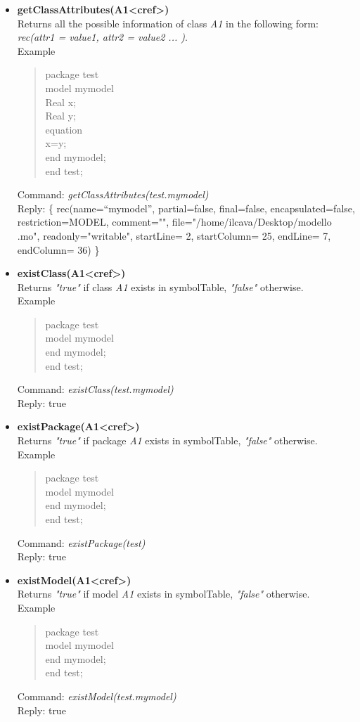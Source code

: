 \documentclass[11pt,a4paper,oneside,english]{book}
\newenvironment{modelicaExamples}{\begin{itemize}}{\end{itemize}}
\newcommand{\api}[2]{\item \textbf{#1} \\ #2}
\newcommand{\tab}{\hspace{2em}}
\newcommand{\command}[1]{Command: \textit{#1}\\}
\newcommand{\reply}[1]{Reply: #1}
\newcommand{\functionex}[2]{\begin{singlespace} \command{#1} \reply{#2} \end{singlespace}}
\newcommand{\examples}{Example}
\newenvironment{mocode}{\begin{verse}\begin{singlespace}\begin{scriptsize}\ttfamily}{\end{scriptsize}\end{singlespace}\end{verse}}
\begin{document}
\begin{modelicaExamples}
		\api{getClassAttributes(A1<cref>)}{Returns all the possible information of class \textit{A1} in the following form:\\ \textit{rec(attr1 = value1, attr2 = value2 ... )}.\\
		\examples
			\begin{mocode}
			package test\\
			\tab model mymodel\\
			\tab\tab	Real x;\\
			\tab\tab Real y;\\
			\tab equation\\
			\tab\tab x=y;\\
			\tab end mymodel;\\
			end test;\\
			\end{mocode}
			\functionex{getClassAttributes(test.mymodel)}
			{\{ rec(name=``mymodel'', partial=false, final=false, encapsulated=fal\-se, restriction=MODEL, comment="", file="/home/ilcava/Desktop/modello .mo", readonly="writable", startLine= 2, startColumn= 25, endLine= 7, endColumn= 36) \}}
		}

		\api{existClass(A1<cref>)}{Returns \textit{"true"} if class \textit{A1} exists in symbolTable, \textit{"false"} otherwise.\\
		\examples
		\begin{mocode}
		package test\\
		\tab model mymodel\\
		\tab end mymodel;\\
		end test;\\
		\end{mocode}
		\functionex{existClass(test.mymodel)}
		{true}
		}

		\api{existPackage(A1<cref>)}{Returns \textit{"true"} if package \textit{A1} exists in symbolTable, \textit{"false"} otherwise.\\
		\examples
		\begin{mocode}
		package test\\
		\tab model mymodel\\
		\tab end mymodel;\\
		end test;\\
		\end{mocode}
		\functionex{existPackage(test)}
		{true}
		}

		\api{existModel(A1<cref>)}{Returns \textit{"true"} if model \textit{A1} exists in symbolTable, \textit{"false"} otherwise.\\
		\examples
		\begin{mocode}
		package test\\
		\tab model mymodel\\
		\tab end mymodel;\\
		end test;\\
		\end{mocode}
		\functionex{existModel(test.mymodel)}
		{true}
		}


\end{modelicaExamples}
\end{document}
